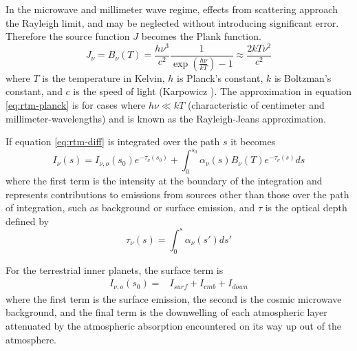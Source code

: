 In the microwave and millimeter wave regime, effects from scattering approach the Rayleigh limit, and may be neglected without introducing significant error. Therefore the source function $J$ becomes the Plank function.
\begin{equation}\label{eq:rtm-planck}
J_\nu = B_\nu(T) = \frac{h\nu^3}{c^2} \frac{1}{\exp(\frac{h\nu}{kT})-1} \approx \frac{2kT\nu^2}{c^2}
\end{equation}
where $T$ is the temperature in Kelvin, $h$ is Planck's constant, $k$ is Boltzman's constant, and $c$ is the speed of light (Karpowicz \cite{Karpowicz-thesis}). The approximation in equation \ref{eq:rtm-planck} is for cases where $h\nu \ll kT$ (characteristic of centimeter and millimeter-wavelengths) and is known as the Rayleigh-Jeans approximation. %

If equation \ref{eq:rtm-diff} is integrated over the path $s$ it becomes
\begin{equation}\label{eq:rtm-integrated}
I_\nu(s) = I_{\nu,o}(s_0)e^{-\tau_\nu(s_0)}+\int_0^{s_0} \alpha_\nu(s)B_\nu(T) e^{-\tau_\nu(s)}ds 
\end{equation}
where the first term is the intensity at the boundary of the integration and represents contributions to emissions from sources other than those over the path of integration, such as background or surface emission, and $\tau$ is the optical depth defined by
\begin{equation}\label{eq:rtm-tau}
\tau_\nu(s) = \int_0^s \alpha_\nu(s') ds'
\end{equation}

For the terrestrial inner planets, the surface term is 
\begin{equation}\label{eq:rtm-surface-term}
\begin{split}
I_{\nu,o}(s_0) =& I_{surf} + I_{cmb}+ I_{down}
\end{split}
\end{equation}
where the first term is the surface emission, the second is the cosmic microwave background, and the final term is the downwelling of each atmospheric layer attenuated by the atmospheric absorption encountered on its way up out of the atmosphere. 

